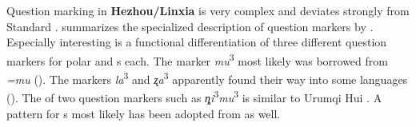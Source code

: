 Question marking in \textbf{Hezhou/Linxia}  is very complex and deviates strongly from Standard .  summarizes the specialized description of question markers by \citet{XieZhang1990}. Especially interesting is a functional differentiation of three different question markers for polar and s each. The marker \textit{mu}\textsuperscript{3} most likely was borrowed from  \textit{=mu} (). The markers \textit{la}\textsuperscript{3} and \textit{ʐa}\textsuperscript{3} apparently found their way into some  languages (). The  of two question markers such as \textit{ȵi}\textsuperscript{3}\textit{mu}\textsuperscript{3} is similar to Urumqi Hui . A  pattern for s most likely has been adopted from  as well.

